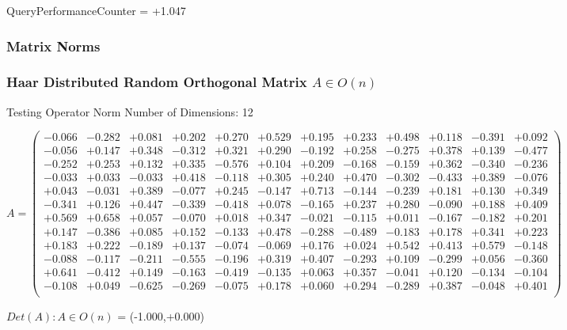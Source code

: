 \documentclass[9pt]{article}
\theoremstyle{plain}
\theoremstyle{definition}
\theoremstyle{remark}
\numberwithin{equation}{section}
\begin{document}
QueryPerformanceCounter  =  +1.047
\subsubsection{Matrix Norms}
\subsubsection{Haar Distributed Random Orthogonal Matrix $A \in O(n)$}
 Testing Operator Norm
Number of Dimensions: 12

$A = \left(
\begin{array}{
cccccccccccc}
-0.066 & -0.282 & +0.081 & +0.202 & +0.270 & +0.529 & +0.195 & +0.233 & +0.498 & +0.118 & -0.391 & +0.092 \\
-0.056 & +0.147 & +0.348 & -0.312 & +0.321 & +0.290 & -0.192 & +0.258 & -0.275 & +0.378 & +0.139 & -0.477 \\
-0.252 & +0.253 & +0.132 & +0.335 & -0.576 & +0.104 & +0.209 & -0.168 & -0.159 & +0.362 & -0.340 & -0.236 \\
-0.033 & +0.033 & -0.033 & +0.418 & -0.118 & +0.305 & +0.240 & +0.470 & -0.302 & -0.433 & +0.389 & -0.076 \\
+0.043 & -0.031 & +0.389 & -0.077 & +0.245 & -0.147 & +0.713 & -0.144 & -0.239 & +0.181 & +0.130 & +0.349 \\
-0.341 & +0.126 & +0.447 & -0.339 & -0.418 & +0.078 & -0.165 & +0.237 & +0.280 & -0.090 & +0.188 & +0.409 \\
+0.569 & +0.658 & +0.057 & -0.070 & +0.018 & +0.347 & -0.021 & -0.115 & +0.011 & -0.167 & -0.182 & +0.201 \\
+0.147 & -0.386 & +0.085 & +0.152 & -0.133 & +0.478 & -0.288 & -0.489 & -0.183 & +0.178 & +0.341 & +0.223 \\
+0.183 & +0.222 & -0.189 & +0.137 & -0.074 & -0.069 & +0.176 & +0.024 & +0.542 & +0.413 & +0.579 & -0.148 \\
-0.088 & -0.117 & -0.211 & -0.555 & -0.196 & +0.319 & +0.407 & -0.293 & +0.109 & -0.299 & +0.056 & -0.360 \\
+0.641 & -0.412 & +0.149 & -0.163 & -0.419 & -0.135 & +0.063 & +0.357 & -0.041 & +0.120 & -0.134 & -0.104 \\
-0.108 & +0.049 & -0.625 & -0.269 & -0.075 & +0.178 & +0.060 & +0.294 & -0.289 & +0.387 & -0.048 & +0.401 \\
\end{array}
\right)$ \newline 

$Det(A) :   A \in O(n)$ = (-1.000,+0.000)
\end{document}
